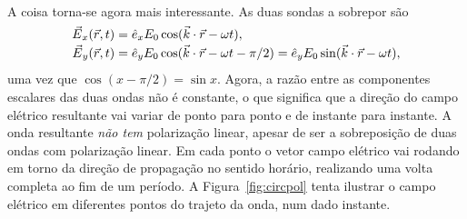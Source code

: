 \begin{description}[leftmargin=0pt,labelindent=0pt]
\item[\textbf{Caso 3, $\bm{\delta\varphi=\pi/2}$}]\hfil\\
A coisa torna-se agora mais interessante. As duas sondas a sobrepor são
\begin{equation}\label{eq:circpol}
\begin{aligned}
\vec E_x(\vec r,t)&=\he_x E_0\cos(\vec k\cdot\vec r-\omega t),\\
\vec E_y(\vec r,t)&=\he_y E_0\cos(\vec k\cdot\vec r-\omega t - \pi/2)=
\he_y E_0\sin(\vec k\cdot\vec r-\omega t),
\end{aligned}
\end{equation}
uma vez que $\cos(x-\pi/2)=\sin x$.
Agora, a razão entre as componentes escalares das duas ondas não é constante, o
que significa que a direção do campo elétrico resultante vai variar de ponto
para ponto e de instante para instante. A onda resultante \emph{não tem}
polarização linear, apesar de ser a sobreposição de duas ondas com polarização
linear. Em cada ponto o vetor campo elétrico vai rodando em torno da direção de
propagação no sentido horário, realizando uma volta completa ao fim de um
período.  A Figura~\ref{fig:circpol} tenta ilustrar o campo elétrico em
diferentes pontos do trajeto da onda, num dado instante.
\begin{figure}[htb]
{\centering
\def\zangle{210}
\def\xangle{-20}
}
\end{figure}
\end{description}
